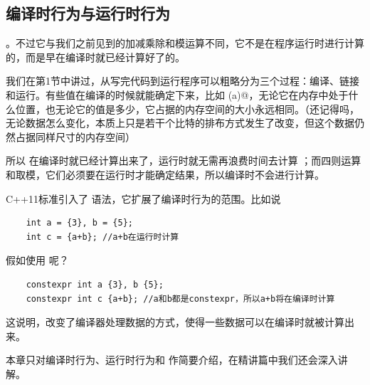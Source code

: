 \subsection*{编译时行为与运行时行为}
。不过它与我们之前见到的加减乘除和模运算不同，它不是在程序运行时进行计算的，而是早在编译时就已经计算好了的。\par
我们在第1节中讲过，从写完代码到运行程序可以粗略分为三个过程：编译、链接和运行。有些值在编译的时候就能确定下来，比如 \lstinline@sizeof (a)@，无论它在内存中处于什么位置，也无论它的值是多少，它占据的内存空间的大小永远相同。（还记得吗，无论数据怎么变化，本质上只是若干个比特的排布方式发生了改变，但这个数据仍然占据同样尺寸的内存空间）\par
所以 \lstinline@sizeof@ 在编译时就已经计算出来了，运行时就无需再浪费时间去计算 \lstinline@sizeof@；而四则运算和取模，它们必须要在运行时才能确定结果，所以编译时不会进行计算。\par
C++11标准引入了 \lstinline@constexpr@ 语法，它扩展了编译时行为的范围。比如说
\begin{lstlisting}
    int a = {3}, b = {5};
    int c = {a+b}; //a+b在运行时计算
\end{lstlisting}
假如使用 \lstinline@constexpr@ 呢？
\begin{lstlisting}
    constexpr int a {3}, b {5};
    constexpr int c {a+b}; //a和b都是constexpr，所以a+b将在编译时计算
\end{lstlisting}
这说明，\lstinline@constexpr@ 改变了编译器处理数据的方式，使得一些数据可以在编译时就被计算出来。\par
本章只对编译时行为、运行时行为和 \lstinline@constexpr@ 作简要介绍，在精讲篇中我们还会深入讲解。\par
